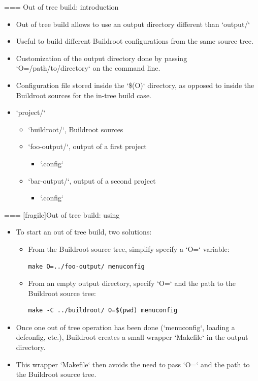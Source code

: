 === {Out of tree build: introduction}
  \begin{itemize}
  \item Out of tree build allows to use an output directory different
    than `output/`
  \item Useful to build different Buildroot configurations from the
    same source tree.
  \item Customization of the output directory done by passing
    `O=/path/to/directory` on the command line.
  \item Configuration file stored inside the `\$(O)` directory, as
    opposed to inside the Buildroot sources for the in-tree build
    case.
  \item `project/`
    \begin{itemize}
    \item `buildroot/`, Buildroot sources
    \item `foo-output/`, output of a first project
      \begin{itemize}
      \item `.config`
      \end{itemize}
    \item `bar-output/`, output of a second project
      \begin{itemize}
      \item `.config`
      \end{itemize}
    \end{itemize}
  \end{itemize}


=== [fragile]{Out of tree build: using}
  \begin{itemize}
  \item To start an out of tree build, two solutions:
    \begin{itemize}
    \item From the Buildroot source tree, simplify specify a `O=`
      variable:
      \begin{block}{}
\begin{verbatim}
make O=../foo-output/ menuconfig
\end{verbatim}
      \end{block}
    \item From an empty output directory, specify `O=` and the
      path to the Buildroot source tree:
      \begin{block}{}
\begin{verbatim}
make -C ../buildroot/ O=$(pwd) menuconfig
\end{verbatim}
      \end{block}
    \end{itemize}
  \item Once one out of tree operation has been done
    (`menuconfig`, loading a defconfig, etc.), Buildroot creates
    a small wrapper `Makefile` in the output directory.
  \item This wrapper `Makefile` then avoids the need to pass
    `O=` and the path to the Buildroot source tree.
  \end{itemize}


